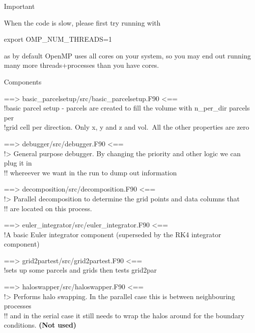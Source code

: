 \documentclass{beamer}
\newenvironment{Shaded}{}{}
\newcommand{\VariableTok}[1]{\textcolor[rgb]{0.00,0.00,0.00}{{#1}}}
\newcommand{\BuiltInTok}[1]{{#1}}
\newcommand{\NormalTok}[1]{{#1}}
\begin{document}
\begin{frame}[fragile]{Important}
\protect\hypertarget{important}{}

When the code is slow, please first try running with

\begin{Shaded}
\begin{Highlighting}[]
\BuiltInTok{export} \VariableTok{OMP_NUM_THREADS=}\NormalTok{1}
\end{Highlighting}
\end{Shaded}

as by default OpenMP uses all cores on your system, so you may end out
running many more threads+processes than you have cores.

\end{frame}

\begin{frame}{Components}
\protect\hypertarget{components}{}

==\textgreater{} basic\_parcelsetup/src/basic\_parcelsetup.F90
\textless{}==\\
!basic parcel setup - parcels are created to fill the volume with
n\_per\_dir parcels per\\
!grid cell per direction. Only x, y and z and vol.~All the other
properties are zero

==\textgreater{} debugger/src/debugger.F90 \textless{}==\\
!\textgreater{} General purpose debugger. By changing the priority and
other logic we can plug it in\\
!! whereever we want in the run to dump out information

==\textgreater{} decomposition/src/decomposition.F90 \textless{}==\\
!\textgreater{} Parallel decomposition to determine the grid points and
data columns that\\
!! are located on this process.

==\textgreater{} euler\_integrator/src/euler\_integrator.F90
\textless{}==\\
!A basic Euler integrator component (superseded by the RK4 integrator
component)

==\textgreater{} grid2partest/src/grid2partest.F90 \textless{}==\\
!sets up some parcels and grids then tests grid2par

==\textgreater{} haloswapper/src/haloswapper.F90 \textless{}==\\
!\textgreater{} Performs halo swapping. In the parallel case this is
between neighbouring processes\\
!! and in the serial case it still needs to wrap the halos around for
the boundary conditions. \textbf{(Not used) }


\end{frame}
\end{document}
